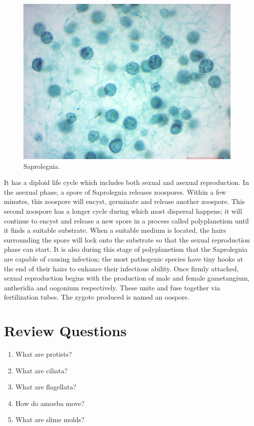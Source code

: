 \begin{figure}

{\centering \includegraphics[width=0.7\linewidth]{./figures/protists/saprolegnia} 

}

\caption{Saprolegnia.}\label{fig:saprolegnia}
\end{figure}

It has a diploid life cycle which includes both sexual and asexual
reproduction. In the asexual phase, a spore of Saprolegnia releases
zoospores. Within a few minutes, this zoospore will encyst, germinate
and release another zoospore. This second zoospore has a longer cycle
during which most dispersal happens; it will continue to encyst and
release a new spore in a process called polyplanetism until it finds a
suitable substrate. When a suitable medium is located, the hairs
surrounding the spore will lock onto the substrate so that the sexual
reproduction phase can start. It is also during this stage of
polyplanetism that the Saprolegnia are capable of causing infection; the
most pathogenic species have tiny hooks at the end of their hairs to
enhance their infectious ability. Once firmly attached, sexual
reproduction begins with the production of male and female gametangium,
antheridia and oogonium respectively. These unite and fuse together via
fertilization tubes. The zygote produced is named an oospore.

\section{Review Questions}\label{review-questions-10}

\begin{enumerate}
\def\labelenumi{\arabic{enumi}.}
\tightlist
\item
  What are protists?
\item
  What are ciliata?
\item
  What are flagellata?
\item
  How do amoeba move?
\item
  What are slime molds?
\end{enumerate}



